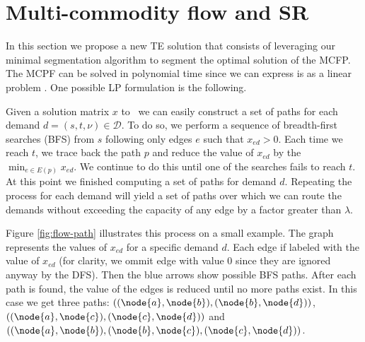 \section{Multi-commodity flow and SR}


\vspace{0.5cm}


In this section we propose a new TE solution that consists of leveraging our minimal segmentation algorithm
to segment the optimal solution of the MCFP. The MCPF can be solved in polynomial time since we can
express is as a linear problem . One possible LP formulation is the following.


Given a solution matrix $x$ to \mcflp~we can easily construct a set of paths for each demand $d = (s, t, \nu) \in \mathcal{D}$.
To do so, we perform a sequence of breadth-first searches (BFS) from $s$ following only edges $e$ such that $x_{ed} > 0$. Each time we reach $t$, we 
trace back the path $p$ and reduce the value of $x_{ed}$ by the $\min_{e \in E(p)} x_{ed}$. We continue to do this until one of the searches
fails to reach $t$. At this point we finished computing a set of paths for demand $d$. Repeating the process for each demand will yield a set of 
paths over which we can route the demands without exceeding the capacity of any edge by a factor greater than $\lambda$. 

Figure \ref{fig:flow-path} illustrates this process on a small example. The graph represents the values of $x_{ed}$ for a specific demand $d$. Each edge
if labeled with the value of $x_{ed}$ (for clarity, we ommit edge with value $0$ since they are ignored anyway by the DFS). Then the blue arrows show possible
BFS paths. After each path is found, the value of the edges is reduced until no more paths exist. In this case we get three paths: 
$((\node{a}, \node{b}), (\node{b}, \node{d}))$, $((\node{a}, \node{c}), (\node{c}, \node{d}))$ and $((\node{a}, \node{b}), (\node{b}, \node{c}), (\node{c}, \node{d}))$.

